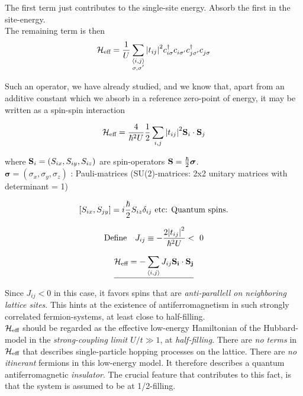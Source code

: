 The first term just contributes to the single-site energy. Absorb the first in the site-energy. \\

The remaining term is then \begin{equation}
    \mathcal{H}_{\text{eff}} = \frac{1}{U} \sum_{\substack{\langle i, j \rangle \\ \sigma, \sigma'}} \abs{t_{ij}}^2 c_{i \sigma}^\dagger c_{i \sigma'}^{} c_{j \sigma'}^\dagger c_{j \sigma}^{}
\end{equation}

Such an operator, we have already studied, and we know that, apart from an additive constant which we absorb in a reference zero-point of energy, it may be written as a spin-spin interaction

\begin{equation}
    \mathcal{H}_{\text{eff}} = \frac{4}{\hbar^2 U} \frac{1}{2} \sum_{i, j} \abs{t_{ij}}^2 \vb{S}_i \cdot \vb{S}_j
\end{equation}

where $\vb{S}_i = (S_{ix}, S_{iy}, S_{iz})$ are spin-operators $\vb{S} = \frac{\hbar}{2} \bm{\sigma}$. \\

$\bm{\sigma} = (\sigma_x, \sigma_y, \sigma_z)$ : Pauli-matrices (SU(2)-matrices: 2x2 unitary matrices with determinant = 1)

\begin{equation}
    \comm{S_{ix}}{S_{jy}} = i\frac{\hbar}{2}S_{iz}\delta_{ij} \ \text{etc: Quantum spins}.
\end{equation}

\begin{equation}
    \text{Define} \quad J_{ij} \equiv - \frac{2 \abs{t_{ij}}^2}{\hbar^2 U} < \ 0
\end{equation}

\begin{equation} \emph{
    \mathcal{H}_{\text{eff}} = -\sum_{\langle i, j \rangle} J_{ij} \vb{S_i} \cdot \vb{S_j}}
\end{equation}

 Since $J_{ij} < 0$ in this case, it favors spins that are \emph{anti-parallell on neighboring lattice sites}. This hints at the existence of antiferromagnetism in such strongly correlated fermion-systems, at least close to half-filling. \\

$\mathcal{H}_{\text{eff}}$ should be regarded as the effective low-energy Hamiltonian of the Hubbard-model in the \emph{strong-coupling limit $U/t \gg 1$}, at \emph{half-filling}. There are \emph{no terms} in $\mathcal{H}_{\text{eff}}$ that describes single-particle hopping processes on the lattice. There are \emph{no itinerant} fermions in this low-energy model. It therefore describes a quantum antiferromagnetic \emph{insulator}. The crucial feature that contributes to this fact, is that the system is assumed to be at 1/2-filling. \\

